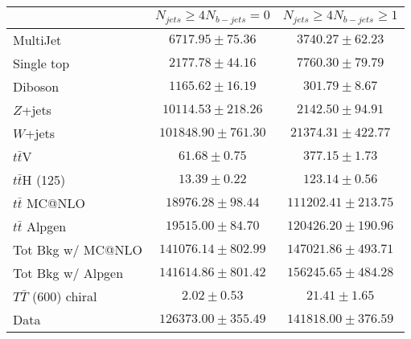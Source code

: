 \begin{tabular}{l c c } \toprule\toprule
 & $N_{jets}\geq 4$$N_{b-jets}= 0$ 		 & $N_{jets}\geq 4$$N_{b-jets}\geq 1$ 		 \\ \midrule 
  MultiJet  & $6717.95 \pm 75.36$  & $3740.27 \pm 62.23$ \\ 
 Single top  & $2177.78 \pm 44.16$  & $7760.30 \pm 79.79$ \\ 
 Diboson  & $1165.62 \pm 16.19$  & $301.79 \pm 8.67$ \\ 
 $Z$+jets  & $10114.53 \pm 218.26$  & $2142.50 \pm 94.91$ \\ 
 $W$+jets  & $101848.90 \pm 761.30$  & $21374.31 \pm 422.77$ \\ 
 $t\bar{t}$V  & $61.68 \pm 0.75$  & $377.15 \pm 1.73$ \\ 
 $t\bar{t}$H (125)  & $13.39 \pm 0.22$  & $123.14 \pm 0.56$ \\ 
 $t\bar{t}$ MC@NLO  & $18976.28 \pm 98.44$  & $111202.41 \pm 213.75$ \\ 
 $t\bar{t}$ Alpgen  & $19515.00 \pm 84.70$  & $120426.20 \pm 190.96$ \\ 
\midrule 
  Tot Bkg w/ MC@NLO  & $141076.14 \pm 802.99$  & $147021.86 \pm 493.71$ \\ \midrule 
 \midrule 
  Tot Bkg w/ Alpgen  & $141614.86 \pm 801.42$  & $156245.65 \pm 484.28$ \\ \midrule 
  $T\bar{T}$ (600) chiral  & $2.02 \pm 0.53$  & $21.41 \pm 1.65$ \\ 
 Data  & $126373.00 \pm 355.49$  & $141818.00 \pm 376.59$ \\ 
\bottomrule\end{tabular}